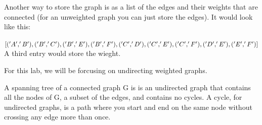 Another way to store the graph is as a list of the edges and their weights that are connected (for an unweighted graph you can just store the edges). It would look like this:

$[( 'A', 'B' ),
 ('B', 'C'),
 ('B', 'E'),
 ('B', 'F'),
 ('C', 'D'),\\
 ('C', 'E'),
 ('C', 'F'),
 ('D', 'E'),
 ('E', 'F')]$\\
A third entry would store the wieght.

For this lab, we will be forcusing on undirecting weighted graphs. 

A spanning tree of a connected graph G is is an undirected graph that contains all the nodes of G, a subset of the edges, and contains no cycles. A cycle, for undirected graphs, is a path where you start and end on the same node without crossing any edge more than once.

